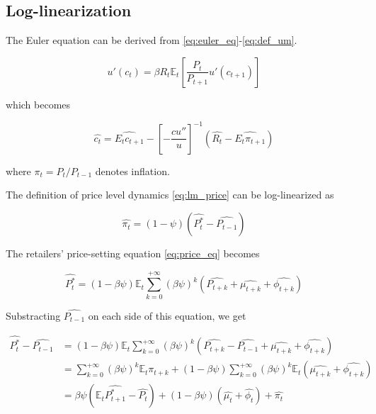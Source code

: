 \newpage 
\subsection{Log-linearization}

The Euler equation can be derived from \eqref{eq:euler_eq}-\eqref{eq:def_um}.

\begin{equation*}
    u' \left( c_t \right) = \beta R_t \mathbb{E}_t \left[ \frac{P_t}{P_{t+1}} u' \left( c_{t+1} \right) \right]
\end{equation*}

which becomes

\begin{equation}
    \widehat{c_t} = \widehat{E_t c_{t+1}} - \left[-\frac{c u''}{u} \right]^{-1} \left( \widehat{R_t} - \widehat{E_t \pi_{t+1}}\right)
\end{equation}

where $\pi_t = P_t / P_{t-1}$ denotes inflation.

The definition of price level dynamics \eqref{eq:lm_price} can be log-linearized as

\begin{equation}
    \widehat{\pi_t} = (1-\psi) \left( \widehat{P_t^*} - \widehat{P_{t-1}} \right) \label{eq:lm_price_ll}
\end{equation}

The retailers' price-setting equation \eqref{eq:price_eq} becomes

\begin{equation}
    \widehat{P_t^*} = (1-\beta\psi) \mathbb{E}_t \sum_{k=0}^{+\infty} (\beta\psi)^{k} \left( \widehat{P_{t+k}} + \widehat{\mu_{t+k}} + \widehat{\phi_{t+k}} \right)
\end{equation}

Substracting $\widehat{P_{t-1}}$ on each side of this equation, we get

\begin{align}
    \widehat{P_t^*} - \widehat{P_{t-1}} &= (1-\beta\psi) \mathbb{E}_t \sum_{k=0}^{+\infty} (\beta\psi)^{k} \left( \widehat{P_{t+k}} - \widehat{P_{t-1}} + \widehat{\mu_{t+k}} + \widehat{\phi_{t+k}} \right)\\
    &= \sum_{k=0}^{+\infty} (\beta\psi)^{k} \mathbb{E}_t \widehat{\pi_{t+k}} + (1-\beta\psi) \sum_{k=0}^{+\infty} (\beta\psi)^{k}  \mathbb{E}_t \left( \widehat{\mu_{t+k}} + \widehat{\phi_{t+k}} \right)\\
    &= \beta \psi \left( \mathbb{E}_t \widehat{P_{t+1}^*} - \widehat{P_{t}} \right) + (1-\beta \psi) \left( \widehat{\mu_t} + \widehat{\phi_t}\right) + \widehat{\pi_t}
\end{align}

